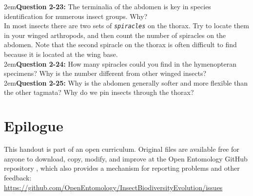 \documentclass[letterpaper, 11pt]{article}
\newcommand{\latinword}[1]{\texttt{\itshape #1}}%
\begin{document}
\hangindent2em\textbf{Question 2-23:} The terminalia of the abdomen is key in species identification for numerous insect groups. Why? \\

\noindent{}In most insects there are two sets of \latinword{spiracles} on the thorax. Try to locate them in your winged arthropods, and then count the number of spiracles on the abdomen. Note that the second spiracle on the thorax is often difficult to find because it is located at the wing base. \\

\hangindent2em\textbf{Question 2-24:} How many spiracles could you find in the hymenopteran specimens? Why is the number different from other winged insects?\\

\hangindent2em\textbf{Question 2-25:} Why is the abdomen generally softer and more flexible than the other tagmata? Why do we pin insects through the thorax?\\

\section*{Epilogue}
This handout is part of an open curriculum. Original files are available free for anyone to download, copy, modify, and improve at the Open Entomology GitHub repository \citep{ENT432}, which also provides a mechanism for reporting problems and other feedback:\\
\url{https://github.com/OpenEntomology/InsectBiodiversityEvolution/issues}




\end{document}
